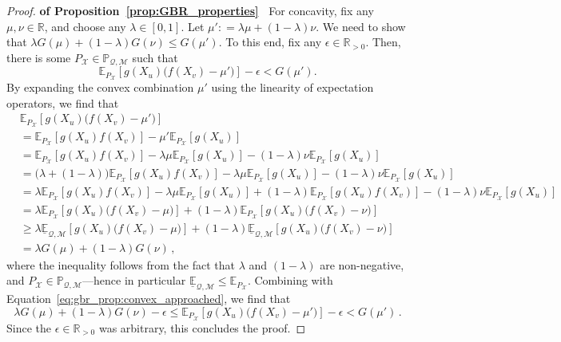 \documentclass[twoside,11pt]{article}
\newcommand{\reals}{\mathbb{R}}
\newcommand{\realspos}{\reals_{>0}}
\newcommand{\states}{\mathcal{X}}
\newcommand{\lexp}{\underline{\mathbb{E}}_{\rateset,\mathcal{M}}}
\newcommand{\rateset}{\mathcal{Q}}
\newcommand{\coloneqq}{:\!=}
\begin{document}
\begin{proof}{\bf of Proposition~\ref{prop:GBR_properties}~}
For concavity, fix any $\mu,\nu\in\reals$, and choose any $\lambda\in[0,1]$. Let $\mu'\coloneqq \lambda\mu + (1-\lambda)\nu$. We need to show that $\lambda G(\mu) + (1-\lambda)G(\nu) \leq G(\mu')$. To this end, fix any $\epsilon\in\realspos$. Then, there is some ${P_\states}\in\mathbb{P}_{\rateset,\mathcal{M}}$ such that
\begin{equation}\label{eq:gbr_prop:convex_approached}
\mathbb{E}_{P_\states}\left[g(X_u)\bigl(f(X_v) - \mu'\bigr)\right] - \epsilon < G(\mu').
\end{equation}
By expanding the convex combination $\mu'$ using the linearity of expectation operators, we find that
\begin{align*}
&\mathbb{E}_{P_\states}\left[g(X_u)\bigl(f(X_v) - \mu'\bigr)\right]\\  &= \mathbb{E}_{P_\states}\left[g(X_u)f(X_v)\right] - \mu'\mathbb{E}_{P_\states}\left[g(X_u)\right] \\
 &= \mathbb{E}_{P_\states}\left[g(X_u)f(X_v)\right] - \lambda\mu\mathbb{E}_{P_\states}\left[g(X_u)\right] - (1-\lambda)\nu\mathbb{E}_{P_\states}\left[g(X_u)\right] \\
 &= \bigl(\lambda + (1-\lambda)\bigr)\mathbb{E}_{P_\states}\left[g(X_u)f(X_v)\right] - \lambda\mu\mathbb{E}_{P_\states}\left[g(X_u)\right] - (1-\lambda)\nu\mathbb{E}_{P_\states}\left[g(X_u)\right] \\
 &= \lambda\mathbb{E}_{P_\states}\left[g(X_u)f(X_v)\right] - \lambda\mu\mathbb{E}_{P_\states}\left[g(X_u)\right]
+(1-\lambda)\mathbb{E}_{P_\states}\left[g(X_u)f(X_v)\right] - (1-\lambda)\nu\mathbb{E}_{P_\states}\left[g(X_u)\right] \\
 &= \lambda\mathbb{E}_{P_\states}\left[g(X_u)\bigl(f(X_v) - \mu\bigr)\right] + (1-\lambda)\mathbb{E}_{P_\states}\left[g(X_u)\bigl(f(X_v) - \nu\bigr)\right] \\
 &\geq \lambda\lexp\left[g(X_u)\bigl(f(X_v) - \mu\bigr)\right] + (1-\lambda)\lexp\left[g(X_u)\bigl(f(X_v) - \nu\bigr)\right] \\
 &= \lambda G(\mu) + (1-\lambda) G(\nu)\,,
\end{align*}
where the inequality follows from the fact that $\lambda$ and $(1-\lambda)$ are non-negative, and $P_\states\in\mathbb{P}_{\rateset,\mathcal{M}}$---hence in particular $\lexp\leq\mathbb{E}_{P_\states}$.
Combining with Equation~\eqref{eq:gbr_prop:convex_approached}, we find that
\begin{equation*}
\lambda G(\mu) + (1-\lambda) G(\nu) -\epsilon \leq \mathbb{E}_{P_\states}\left[g(X_u)\bigl(f(X_v) - \mu'\bigr)\right] - \epsilon < G(\mu')\,.
\end{equation*}
Since the $\epsilon\in\realspos$ was arbitrary, this concludes the proof.


\end{proof}
\end{document}
